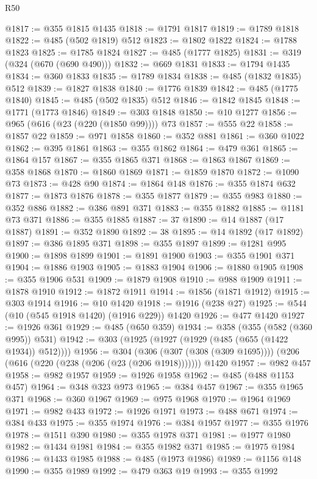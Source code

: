 \begin{lexlean}{R50}
\begin{coremodule}
@1817 := @355 @1815 @1435
@1818 := @1791 @1817
@1819 := @1789 @1818
@1822 := @485 (@502 @1819) @512
@1823 := @1802 @1822
@1824 := @1788 @1823
@1825 := @1785 @1824
@1827 := @485 (@1777 @1825)
@1831 := @319 (@324 (@670 (@690 @490)))
@1832 := @669 @1831
@1833 := @1794 @1435
@1834 := @360 @1833
@1835 := @1789 @1834
@1838 := @485 (@1832 @1835) @512
@1839 := @1827 @1838
@1840 := @1776 @1839
@1842 := @485 (@1775 @1840)
@1845 := @485 (@502 @1835) @512
@1846 := @1842 @1845
@1848 := @1771 (@1773 @1846)
@1849 := @303 @1848
@1850 := @10 @1277
@1856 := @965 (@616 (@23 (@220 (@1850 @99)))) @73
@1857 := @555 @22
@1858 := @1857 @22
@1859 := @971 @1858
@1860 := @352 @881
@1861 := @360 @1022
@1862 := @395 @1861
@1863 := @355 @1862
@1864 := @479 @361
@1865 := @1864 @157
@1867 := @355 @1865 @371
@1868 := @1863 @1867
@1869 := @358 @1868
@1870 := @1860 @1869
@1871 := @1859 @1870
@1872 := @1090 @73
@1873 := @428 @90
@1874 := @1864 @148
@1876 := @355 @1874 @632
@1877 := @1873 @1876
@1878 := @355 @1877
@1879 := @355 @983
@1880 := @352 @886
@1882 := @386 @891 @371
@1883 := @355 @1882
@1885 := @1181 @73 @371
@1886 := @355 @1885
@1887 := 37
@1890 := @14 @1887 (@17 @1887)
@1891 := @352 @1890
@1892 := 38
@1895 := @14 @1892 (@17 @1892)
@1897 := @386 @1895 @371
@1898 := @355 @1897
@1899 := @1281 @995
@1900 := @1898 @1899
@1901 := @1891 @1900
@1903 := @355 @1901 @371
@1904 := @1886 @1903
@1905 := @1883 @1904
@1906 := @1880 @1905
@1908 := @355 @1906 @531
@1909 := @1879 @1908
@1910 := @988 @1909
@1911 := @1878 @1910
@1912 := @1872 @1911
@1914 := @1856 (@1871 @1912)
@1915 := @303 @1914
@1916 := @10 @1420
@1918 := @1916 (@238 @27)
@1925 := @544 (@10 (@545 @1918 @1420) (@1916 @229)) @1420
@1926 := @477 @1420
@1927 := @1926 @361
@1929 := @485 (@650 @359)
@1934 := @358 (@355 (@582 (@360 @995)) @531)
@1942 := @303 (@1925 (@1927 (@1929 (@485 (@655 (@1422 @1934)) @512))))
@1956 := @304
    (@306 (@307 (@308 (@309 @1695))))
    (@206 (@616 (@220 (@238 (@206 (@23 (@206 @1918)))))))
    @1420
@1957 := @982 @457
@1958 := @982 @1957
@1959 := @1926 @1958
@1962 := @485 (@488 @1153 @457)
@1964 := @348 @323 @973
@1965 := @384 @457
@1967 := @355 @1965 @371
@1968 := @360 @1967
@1969 := @975 @1968
@1970 := @1964 @1969
@1971 := @982 @433
@1972 := @1926 @1971
@1973 := @488 @671
@1974 := @384 @433
@1975 := @355 @1974
@1976 := @384 @1957
@1977 := @355 @1976
@1978 := @1511 @390
@1980 := @355 @1978 @371
@1981 := @1977 @1980
@1982 := @1434 @1981
@1984 := @355 @1982 @371
@1985 := @1975 @1984
@1986 := @1433 @1985
@1988 := @485 (@1973 @1986)
@1989 := @1156 @148
@1990 := @355 @1989
@1992 := @479 @363 @19
@1993 := @355 @1992

\end{coremodule}
\end{lexlean}
